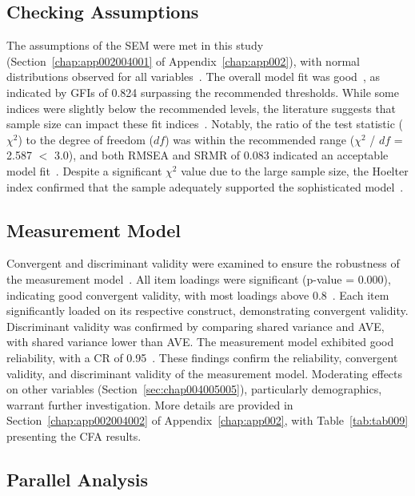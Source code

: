 \subsection{Checking Assumptions}
\label{sec:chap004005001}

The assumptions of the \ac{SEM} were met in this study (Section~\ref{chap:app002004001} of Appendix~\ref{chap:app002}), with normal distributions observed for all variables~\cite{CALISTO2022102922}.
The overall model fit was good~\cite{doi:10.1504/IJMDA.2017.087624}, as indicated by \acp{GFI} of 0.824 surpassing the recommended thresholds.
While some indices were slightly below the recommended levels, the literature suggests that sample size can impact these fit indices~\cite{doi:10.1080/00273171.2019.1602503}.
Notably, the ratio of the test statistic ($\chi^2$) to the degree of freedom ($df$) was within the recommended range ($\chi^2$ / $df$ = 2.587 $<$ 3.0), and both \ac{RMSEA} and \ac{SRMR} of 0.083 indicated an acceptable model fit~\cite{ZHOU2010760}.
Despite a significant $\chi^2$ value due to the large sample size, the Hoelter index confirmed that the sample adequately supported the sophisticated model~\cite{CALISTO2022102922}.

\subsection{Measurement Model}
\label{sec:chap004005002}

Convergent and discriminant validity were examined to ensure the robustness of the measurement model~\cite{CALISTO2022102922}.
All item loadings were significant (p-value = 0.000), indicating good convergent validity, with most loadings above 0.8~\cite{CALISTO2022102922}.
Each item significantly loaded on its respective construct, demonstrating convergent validity.
Discriminant validity was confirmed by comparing shared variance and \ac{AVE}, with shared variance lower than \ac{AVE}.
The measurement model exhibited good reliability, with a \ac{CR} of 0.95~\cite{doi:10.1504/IJMDA.2017.087624}.
These findings confirm the reliability, convergent validity, and discriminant validity of the measurement model.
Moderating effects on other variables (Section~\ref{sec:chap004005005}), particularly demographics, warrant further investigation.
More details are provided in Section~\ref{chap:app002004002} of Appendix~\ref{chap:app002}, with Table~\ref{tab:tab009} presenting the \ac{CFA} results.

\subsection{Parallel Analysis}
\label{sec:chap004005003}

